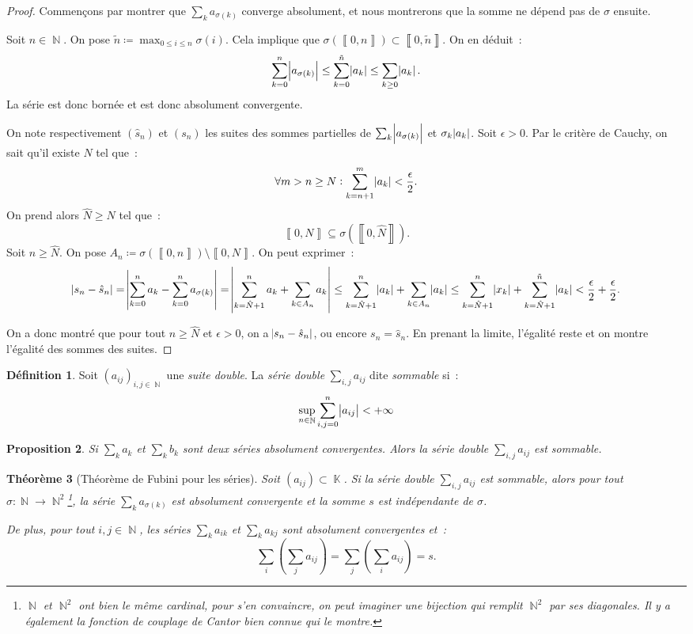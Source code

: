 \documentclass{article}
\DeclareMathOperator{\K}{\mathbb K}
\DeclareMathOperator{\N}{\mathbb N}
\newcommand{\intint}[2]{\left\llbracket#1, #2\right\rrbracket}  %
\newtheorem{thm}{Théorème}[section]
\newtheorem{prp}[thm]{Proposition}
\theoremstyle{definition}
\newtheorem{déf}[thm]{Définition}
\theoremstyle{remark}
\begin{document}
		\begin{proof} Commençons par montrer que $\sum_k a_{\sigma(k)}$ converge absolument, et nous montrerons que la somme ne dépend pas de $\sigma$ ensuite.

		Soit $n \in \N$. On pose $\tilde n \coloneqq \max_{0 \leq i \leq n}\sigma(i)$. Cela implique que $\sigma(\intint 0n) \subset \intint0{\tilde n}$.
		On en déduit~:
		\[\sum_{k=0}^n \abs {a_{\sigma(k)}} \leq \sum_{k=0}^{\tilde n} \abs {a_k} \leq \sum_{k \geq 0}\abs {a_k}.\]
		La série est donc bornée et est donc absolument convergente.

		On note respectivement $(\hat s_n)$ et $(s_n)$ les suites des sommes partielles de $\sum_k \abs {a_{\sigma(k)}}$ et $\sigma_k \abs{a_k}$.
		Soit $\epsilon > 0$. Par le critère de Cauchy, on sait qu'il existe $N$ tel que~:
		\[\forall m > n \geq N : \sum_{k=n+1}^m \abs {a_k} < \frac \epsilon 2.\]
		On prend alors $\hat N \geq N$ tel que~:
		\[\intint 0N \subseteq \sigma\left(\intint 0{\hat N}\right).\]
		Soit $n \geq \hat N$. On pose $A_n \coloneqq \sigma\left(\intint 0n\right) \setminus \intint 0N$. On peut exprimer~:
		\[\abs{s_n - \hat s_n} = \abs{\sum_{k=0}^n a_k - \sum_{k=0}^n a_{\sigma(k)}} = \abs {\sum_{k=\hat N+1}^n a_k + \sum_{k \in A_n} a_k}
			\leq \sum_{k=\hat N+1}^n\abs {a_k} + \sum_{k \in A_n}\abs {a_k} \leq \sum_{k=\hat N+1}^n\abs {x_k} + \sum_{k=\hat N+1}^{\tilde n}\abs {a_k}
			< \frac \epsilon 2 + \frac \epsilon 2.\]

		On a donc montré que pour tout $n \geq \hat N$ et $\epsilon > 0$, on a $\abs {s_n - \hat s_n}$, ou encore $s_n = \hat s_n$. En prenant la limite,
		l'égalité reste et on montre l'égalité des sommes des suites.
		\end{proof}

		\begin{déf} Soit $(a_{ij})_{i, j \in \N}$ une \emph{suite double}. La \emph{série double} $\sum_{i,j}a_{ij}$ dite \emph{sommable} si~:
		\[\sup_{n \in \N}\sum_{i,j=0}^n\abs {a_{ij}} < +\infty\]
		\end{déf}

		\begin{prp} Si $\sum_k a_k$ et $\sum_k b_k$ sont deux séries absolument convergentes. Alors la série double $\sum_{i, j}a_{ij}$ est sommable. \end{prp}

		\begin{thm}[Théorème de Fubini pour les séries] Soit $(a_{ij}) \subset \K$. Si la série double $\sum_{i,j}a_{ij}$ est sommable, alors pour tout
		$\sigma : \N \to \N^2$\footnote{$\N$ et $\N^2$ ont bien le même cardinal, pour s'en convaincre, on peut imaginer une bijection qui remplit $\N^2$
		par ses diagonales. Il y a également la fonction de couplage de Cantor bien connue qui le montre.}, la série $\sum_k a_{\sigma(k)}$ est absolument
		convergente et la somme $s$ est indépendante de $\sigma$.

		De plus, pour tout $i, j \in \N$, les séries $\sum_k a_{ik}$ et $\sum_k a_{kj}$ sont absolument convergentes et~:
		\[\sum_i\left(\sum_j a_{ij}\right) = \sum_j\left(\sum_i a_{ij}\right) = s.\]
		\end{thm}
\end{document}
